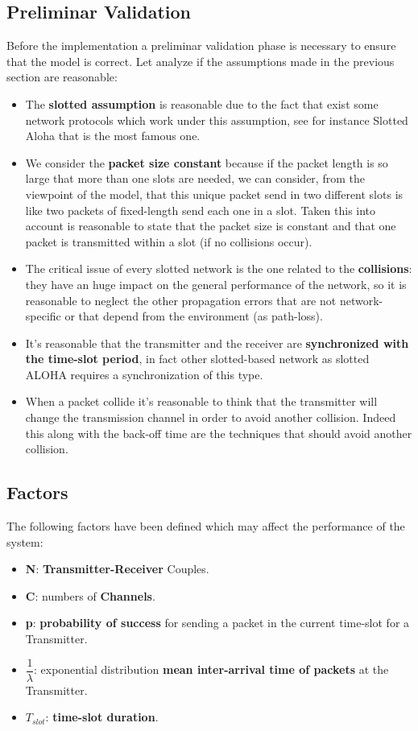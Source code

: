 \subsection{Preliminar Validation}
Before the implementation a preliminar validation phase is necessary to ensure that the model is correct. Let analyze if the assumptions made in the previous section are reasonable:
\begin{itemize}
	\item The \textbf{slotted assumption} is reasonable due to the fact that exist some network protocols which work under this assumption, see for instance Slotted Aloha that is the most famous one.
	\item We consider the \textbf{packet size constant} because if the packet length is so large that more than one slots are needed, we can consider, from the viewpoint of the model, that this unique packet send in two different slots is like two packets of fixed-length send each one in a slot. Taken this into account is reasonable to state that the packet size is constant and that one packet is transmitted within a slot (if no collisions occur).
	\item The critical issue of every slotted network is the one related to the \textbf{collisions}: they have an huge impact on the general performance of the network, so it is reasonable to neglect the other propagation errors that are not network-specific or that depend from the environment (as path-loss).
	\item It's reasonable that the transmitter and the receiver are \textbf{synchronized with the time-slot period}, in fact other slotted-based network as slotted ALOHA requires a synchronization of this type.
	\item When a packet collide it's reasonable to think that the transmitter will change the transmission channel in order to avoid another collision. Indeed this along with the back-off time are the techniques that should avoid another collision. 
\end{itemize}
\subsection{Factors}
The following factors have been defined which may affect the performance of the system:
\begin{itemize}
	\item \textbf{N}: \textbf{Transmitter-Receiver} Couples.
	\item \textbf{C}: numbers of \textbf{Channels}.
	\item \textbf{p}: \textbf{probability of success} for sending a packet in the current time-slot for a Transmitter.
	\item \textbf{$\dfrac{1}{\lambda}$}: exponential distribution \textbf{mean inter-arrival time of packets} at the Transmitter.
	\item $T_{slot}$: \textbf{time-slot duration}.
	
\end{itemize}